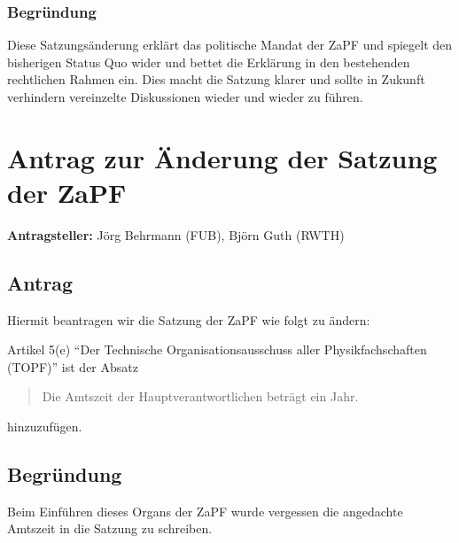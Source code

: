 \documentclass[draft,10pt,oneside]{scrartcl}
\begin{document}
\subsubsection*{Begründung}

Diese Satzungsänderung erklärt das politische Mandat der ZaPF und spiegelt den
bisherigen Status Quo wider und bettet die Erklärung in den bestehenden
rechtlichen Rahmen ein. Dies macht die Satzung klarer und sollte in Zukunft
verhindern vereinzelte Diskussionen wieder und wieder zu führen.

\newpage

\section*{Antrag zur Änderung der Satzung der ZaPF}

\textbf{Antragsteller:} Jörg Behrmann (FUB), Björn Guth (RWTH)

\subsection*{Antrag}

Hiermit beantragen wir die Satzung der ZaPF wie folgt zu ändern:

Artikel 5(e) ``Der Technische Organisationsausschuss aller Physikfachschaften
(TOPF)'' ist der Absatz
\begin{quote}
  Die Amtszeit der Hauptverantwortlichen beträgt ein Jahr.
\end{quote}
hinzuzufügen.

\subsection*{Begründung}

Beim Einführen dieses Organs der ZaPF wurde vergessen die angedachte Amtszeit in
die Satzung zu schreiben.
\end{document}
